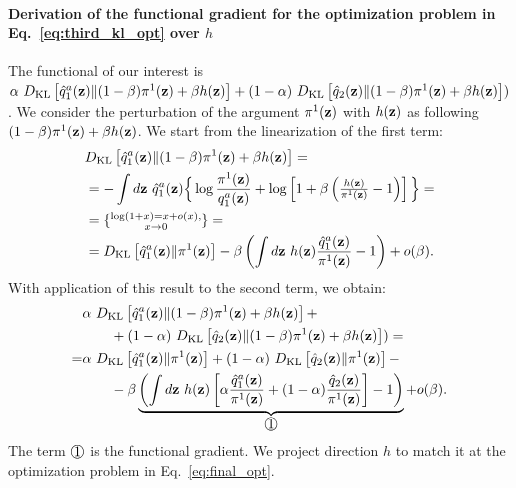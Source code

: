 \paragraph{Derivation of the functional gradient for the optimization problem in Eq.~\ref{eq:third_kl_opt} over $h$}
The functional of our interest is $\alpha~D_{\mathrm{KL}}\left[\hat{q}_{1}^{a}({\mathbf{z}})\|(1-\beta)\pi^{1}({\mathbf{z}})+\beta h({\mathbf{z}})\right] +  (1-\alpha)~D_{\mathrm{KL}}\left[\hat{q}_{2}({\mathbf{z}})\|(1-\beta)\pi^{1}({\mathbf{z}})+\beta h({\mathbf{z}})\right])$.
We consider the perturbation of the argument $\pi^{1}({\mathbf{z}})$ with $h({\mathbf{z}})$ as following $(1-\beta)\pi^{1}({\mathbf{z}})+\beta h({\mathbf{z}})$. We start from the linearization of the first term:
\begin{equation}
    \begin{aligned}
     & D_{\mathrm{KL}}\left[\hat{q}_{1}^{a}({\mathbf{z}})\|(1-\beta)\pi^{1}({\mathbf{z}})+\beta h({\mathbf{z}})\right] = \\
     & = -\int d{\mathbf{z}}~\hat{q}_{1}^{a}({\mathbf{z}})\Big\{\log\frac{\pi^{1}({\mathbf{z}})}{{q}_{1}^{a}({\mathbf{z}})}+\log \left[1+\beta \left(\tfrac{h({\mathbf{z}})}{\pi^{1}({\mathbf{z}})}- 1\right)\right]\Big\} = \\ 
     & = \{\substack{\log(1+x) = x + o(x),\\ x\to 0}\} =  \\
     & = D_{\mathrm{KL}}\left[\hat{q}_{1}^{a}({\mathbf{z}})\|\pi^{1}({\mathbf{z}})\right] - \beta\left(\int d{\mathbf{z}}~h({\mathbf{z}}) \frac{\hat{q}_{1}^{a}({\mathbf{z}})}{\pi^{1}({\mathbf{z}})} - 1\right) + o(\beta).
    \end{aligned}
\end{equation}
With application of this result to the second term, we obtain:
\begin{equation}
    \begin{aligned}
     &\alpha~\KL{\hat{q}_{1}^{a}(\rvz)}{(1-\beta)\pi^{1}(\rvz)+\beta h(\rvz)} +  \\
     & \quad\quad + (1-\alpha)~\KL{\hat{q}_{2}(\rvz)}{(1-\beta)\pi^{1}(\rvz)+\beta h(\rvz)}) = \\
    = &\alpha~\KL{\hat{q}_{1}^{a}(\rvz)}{\pi^{1}(\rvz)} + (1-\alpha)~\KL{\hat{q}_{2}(\rvz)}{\pi^{1}(\rvz)} - \\
    & \quad\quad- \beta\underbrace{\left(\int d\rvz~h(\rvz)\left[\alpha \frac{\hat{q}_{1}^{a}(\rvz)}{\pi^{1}(\rvz)} + (1-\alpha)\frac{\hat{q}_{2}(\rvz)}{\pi^{1}(\rvz)}\right]- 1\right)}_{ \raisebox{.5pt}{\textcircled{\raisebox{-.9pt} {\text{\ttfamily \normalfont 1}}}}} + o(\beta).
    \end{aligned}
\end{equation}
The term $\raisebox{.5pt}{\textcircled{\raisebox{-.9pt} {\text{\ttfamily \normalfont 1}}}}$ is the functional gradient. We project direction $h$ to match it at the optimization problem in Eq.~\ref{eq:final_opt}.


